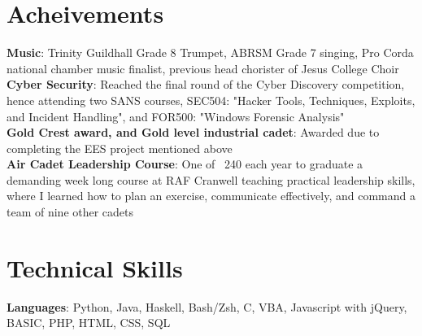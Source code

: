 \documentclass[letterpaper,11pt]{article}
\begin{document}
\section{Acheivements}
 \begin{itemize}[leftmargin=0.15in, label={}]
    \small{\item{
     \textbf{Music}{: Trinity Guildhall Grade 8 Trumpet, ABRSM Grade 7 singing, Pro Corda national chamber music finalist, previous head chorister of Jesus College Choir} \\
     \textbf{Cyber Security}{: Reached the final round of the Cyber Discovery competition, hence attending two SANS courses, SEC504: "Hacker Tools, Techniques, Exploits, and Incident Handling", and FOR500: "Windows Forensic Analysis"} \\
     \textbf{Gold Crest award, and Gold level industrial cadet}{: Awarded due to completing the EES project mentioned above} \\
     \textbf{Air Cadet Leadership Course}{: One of ~240 each year to graduate a demanding week long course at RAF Cranwell teaching practical leadership skills, where I learned how to plan an exercise, communicate effectively, and command a team of nine other cadets}
    }}
 \end{itemize}



%
\section{Technical Skills}
 \begin{itemize}[leftmargin=0.15in, label={}]
    \small{\item{
     \textbf{Languages}{: Python, Java, Haskell, Bash/Zsh, C, VBA, Javascript with jQuery, BASIC, PHP, HTML, CSS, SQL} \\
    }}
 \end{itemize}


\end{document}

